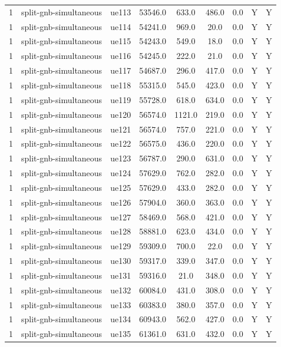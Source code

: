 \begin{table}[ht]
\begin{tabular}{|c|c|c|c|c|c|c|c|c|}
1 & split-gnb-simultaneous & ue113 & 53546.0 & 633.0 & 486.0 & 0.0 & Y & Y \\
1 & split-gnb-simultaneous & ue114 & 54241.0 & 969.0 & 20.0 & 0.0 & Y & Y \\
1 & split-gnb-simultaneous & ue115 & 54243.0 & 549.0 & 18.0 & 0.0 & Y & Y \\
1 & split-gnb-simultaneous & ue116 & 54245.0 & 222.0 & 21.0 & 0.0 & Y & Y \\
1 & split-gnb-simultaneous & ue117 & 54687.0 & 296.0 & 417.0 & 0.0 & Y & Y \\
1 & split-gnb-simultaneous & ue118 & 55315.0 & 545.0 & 423.0 & 0.0 & Y & Y \\
1 & split-gnb-simultaneous & ue119 & 55728.0 & 618.0 & 634.0 & 0.0 & Y & Y \\
1 & split-gnb-simultaneous & ue120 & 56574.0 & 1121.0 & 219.0 & 0.0 & Y & Y \\
1 & split-gnb-simultaneous & ue121 & 56574.0 & 757.0 & 221.0 & 0.0 & Y & Y \\
1 & split-gnb-simultaneous & ue122 & 56575.0 & 436.0 & 220.0 & 0.0 & Y & Y \\
1 & split-gnb-simultaneous & ue123 & 56787.0 & 290.0 & 631.0 & 0.0 & Y & Y \\
1 & split-gnb-simultaneous & ue124 & 57629.0 & 762.0 & 282.0 & 0.0 & Y & Y \\
1 & split-gnb-simultaneous & ue125 & 57629.0 & 433.0 & 282.0 & 0.0 & Y & Y \\
1 & split-gnb-simultaneous & ue126 & 57904.0 & 360.0 & 363.0 & 0.0 & Y & Y \\
1 & split-gnb-simultaneous & ue127 & 58469.0 & 568.0 & 421.0 & 0.0 & Y & Y \\
1 & split-gnb-simultaneous & ue128 & 58881.0 & 623.0 & 434.0 & 0.0 & Y & Y \\
1 & split-gnb-simultaneous & ue129 & 59309.0 & 700.0 & 22.0 & 0.0 & Y & Y \\
1 & split-gnb-simultaneous & ue130 & 59317.0 & 339.0 & 347.0 & 0.0 & Y & Y \\
1 & split-gnb-simultaneous & ue131 & 59316.0 & 21.0 & 348.0 & 0.0 & Y & Y \\
1 & split-gnb-simultaneous & ue132 & 60084.0 & 431.0 & 308.0 & 0.0 & Y & Y \\
1 & split-gnb-simultaneous & ue133 & 60383.0 & 380.0 & 357.0 & 0.0 & Y & Y \\
1 & split-gnb-simultaneous & ue134 & 60943.0 & 562.0 & 427.0 & 0.0 & Y & Y \\
1 & split-gnb-simultaneous & ue135 & 61361.0 & 631.0 & 432.0 & 0.0 & Y & Y \\

\end{tabular}
\end{table}
